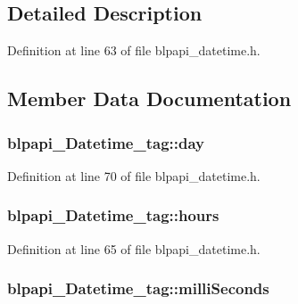 \subsection{Detailed Description}


Definition at line 63 of file blpapi\+\_\+datetime.\+h.



\subsection{Member Data Documentation}
\subsubsection[{\texorpdfstring{day}{day}}]{ blpapi\+\_\+\+Datetime\+\_\+tag\+::day}\hypertarget{structblpapi___datetime__tag_a03ef3fef126d8056e584317848b0791b}{}\label{structblpapi___datetime__tag_a03ef3fef126d8056e584317848b0791b}


Definition at line 70 of file blpapi\+\_\+datetime.\+h.

\subsubsection[{\texorpdfstring{hours}{hours}}]{ blpapi\+\_\+\+Datetime\+\_\+tag\+::hours}\hypertarget{structblpapi___datetime__tag_a086de25506d9608b81b646899ef49bb5}{}\label{structblpapi___datetime__tag_a086de25506d9608b81b646899ef49bb5}


Definition at line 65 of file blpapi\+\_\+datetime.\+h.

\subsubsection[{\texorpdfstring{milli\+Seconds}{milliSeconds}}]{ blpapi\+\_\+\+Datetime\+\_\+tag\+::milli\+Seconds}\hypertarget{structblpapi___datetime__tag_a380bba06b9ccefacfd679480e3373780}{}\label{structblpapi___datetime__tag_a380bba06b9ccefacfd679480e3373780}



